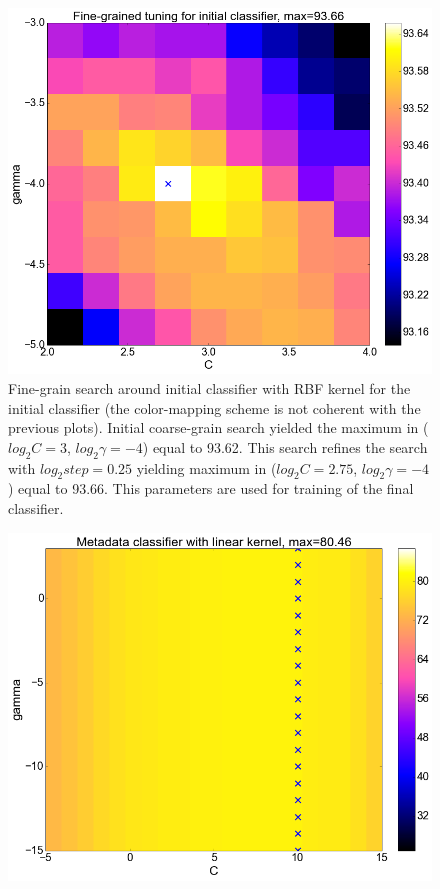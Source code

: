 \begin{center}
\begin{figure}
  \label{fig:initial_sigmoid}
\end{figure}
\begin{figure}
	\centering
  \includegraphics[width=\textwidth]{plots/init_fine}
  \caption{Fine-grain search around initial classifier with RBF kernel for the initial classifier (the color-mapping scheme is not coherent with the previous plots). Initial coarse-grain search yielded the maximum in ($log_{2}C=3$, $log_{2}\gamma=-4$) equal to 93.62. This search refines the search with $log_{2}step=0.25$ yielding maximum in ($log_{2}C=2.75$, $log_{2}\gamma=-4$) equal to 93.66. This parameters are used for training of the final classifier.}
  \label{fig:initial_fine}
\end{figure}
\begin{figure}
	\centering
  \includegraphics[width=\textwidth]{plots/meta_linear}

\end{figure}
\end{center}
